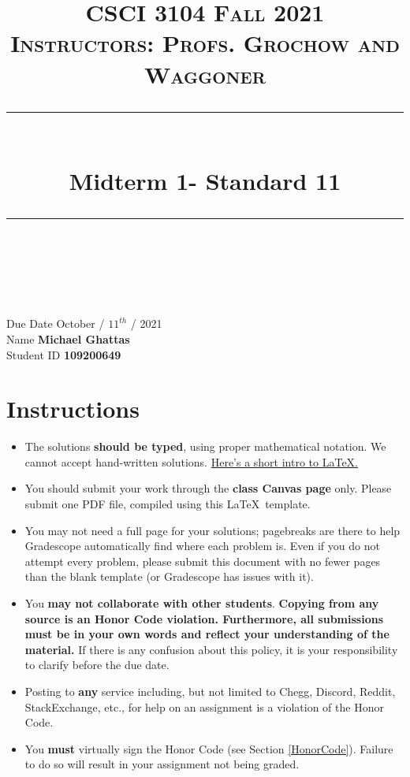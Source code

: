 \documentclass[11pt]{article}
\title{
\normalfont \normalsize 
\textsc{CSCI 3104 Fall 2021 \\ 
Instructors: Profs. Grochow and Waggoner} \\
[10pt] 
\rule{\linewidth}{0.5pt} \\[6pt] 
\huge Midterm 1- Standard 11 \\
\rule{\linewidth}{2pt}  \\[10pt]
}
\date{}
\theoremstyle{definition}
\theoremstyle{definition}
\theoremstyle{definition}
\begin{document}

\maketitle


\noindent
Due Date \dotfill October / $11^{th}$ / 2021 \\
Name \dotfill \textbf{Michael Ghattas} \\
Student ID \dotfill \textbf{109200649} \\


\tableofcontents

\section{Instructions}
 \begin{itemize}
	\item The solutions \textbf{should be typed}, using proper mathematical notation. We cannot accept hand-written solutions. \href{http://ece.uprm.edu/~caceros/latex/introduction.pdf}{Here's a short intro to \LaTeX.}
	\item You should submit your work through the \textbf{class Canvas page} only. Please submit one PDF file, compiled using this \LaTeX \ template.
	\item You may not need a full page for your solutions; pagebreaks are there to help Gradescope automatically find where each problem is. Even if you do not attempt every problem, please submit this document with no fewer pages than the blank template (or Gradescope has issues with it).

	\item You \textbf{may not collaborate with other students}. \textbf{Copying from any source is an Honor Code violation. Furthermore, all submissions must be in your own words and reflect your understanding of the material.} If there is any confusion about this policy, it is your responsibility to clarify before the due date. 

	\item Posting to \textbf{any} service including, but not limited to Chegg, Discord, Reddit, StackExchange, etc., for help on an assignment is a violation of the Honor Code.

	\item You \textbf{must} virtually sign the Honor Code (see Section \ref{HonorCode}). Failure to do so will result in your assignment not being graded.
\end{itemize}
\end{document}

